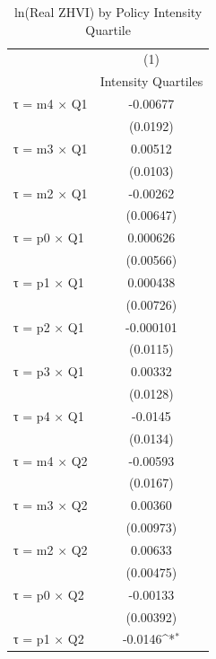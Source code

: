 \begin{table}[htbp]\centering
\def\sym#1{\ifmmode^{#1}\else\(^{#1}\)\fi}
\caption{ln(Real ZHVI) by Policy Intensity Quartile}
\begin{tabular}{l*{1}{c}}
\hline\hline
                    &\multicolumn{1}{c}{(1)}\\
                    &\multicolumn{1}{c}{Intensity Quartiles}\\
\hline
τ = m4 × Q1         &    -0.00677         \\
                    &    (0.0192)         \\
[1em]
τ = m3 × Q1         &     0.00512         \\
                    &    (0.0103)         \\
[1em]
τ = m2 × Q1         &    -0.00262         \\
                    &   (0.00647)         \\
[1em]
τ = p0 × Q1         &    0.000626         \\
                    &   (0.00566)         \\
[1em]
τ = p1 × Q1         &    0.000438         \\
                    &   (0.00726)         \\
[1em]
τ = p2 × Q1         &   -0.000101         \\
                    &    (0.0115)         \\
[1em]
τ = p3 × Q1         &     0.00332         \\
                    &    (0.0128)         \\
[1em]
τ = p4 × Q1         &     -0.0145         \\
                    &    (0.0134)         \\
[1em]
τ = m4 × Q2         &    -0.00593         \\
                    &    (0.0167)         \\
[1em]
τ = m3 × Q2         &     0.00360         \\
                    &   (0.00973)         \\
[1em]
τ = m2 × Q2         &     0.00633         \\
                    &   (0.00475)         \\
[1em]
τ = p0 × Q2         &    -0.00133         \\
                    &   (0.00392)         \\
[1em]
τ = p1 × Q2         &     -0.0146\sym{*}  \\

\end{tabular}
\end{table}

